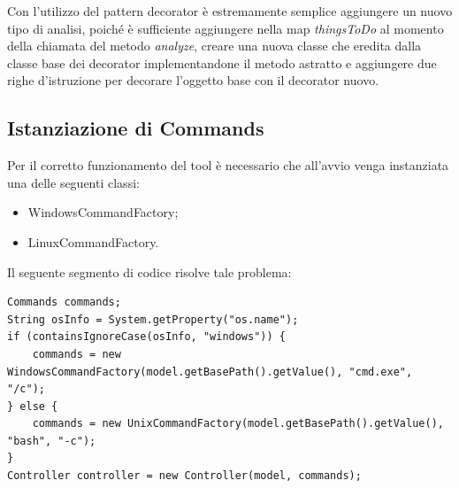 Con l'utilizzo del pattern decorator \`{e} estremamente semplice aggiungere un nuovo tipo di analisi, poiché è sufficiente aggiungere nella map \textit{thingsToDo} al momento della chiamata del metodo \textit{analyze}, creare una nuova classe che eredita dalla classe base dei decorator implementandone il metodo astratto e aggiungere due righe d'istruzione per decorare l'oggetto base con il decorator nuovo.

\subsection{Istanziazione di Commands}\label{subsec:istanziazione-di-commands}
Per il corretto funzionamento del tool è necessario che all'avvio venga instanziata una delle seguenti classi:
\begin{itemize}
    \item WindowsCommandFactory;
    \item LinuxCommandFactory.
\end{itemize}
Il seguente segmento di codice risolve tale problema:

\begin{lstlisting}[caption={Creazione dell'istanza di Commands in base al S.O.},label={lst:commands}]
Commands commands;
String osInfo = System.getProperty("os.name");
if (containsIgnoreCase(osInfo, "windows")) {
    commands = new WindowsCommandFactory(model.getBasePath().getValue(), "cmd.exe", "/c");
} else {
    commands = new UnixCommandFactory(model.getBasePath().getValue(), "bash", "-c");
}
Controller controller = new Controller(model, commands);
\end{lstlisting}